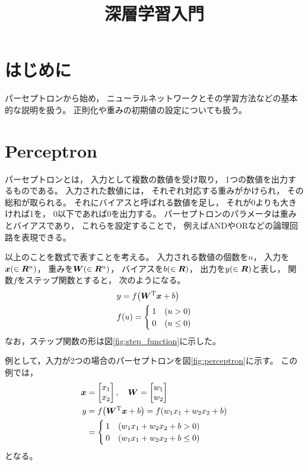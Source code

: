 \documentclass[class=jsarticle, crop=false, dvipdfmx, fleqn]{standalone}
\title{深層学習入門}
\begin{document}
\maketitle
\tableofcontents


\section{はじめに}

パーセプトロンから始め，
ニューラルネットワークとその学習方法などの基本的な説明を扱う。
正則化や重みの初期値の設定についても扱う。



\section{Perceptron}
\label{sec:perceptron}

パーセプトロンとは，
入力として複数の数値を受け取り，
1つの数値を出力するものである。
入力された数値には，
それぞれ対応する重みがかけられ，
その総和が取られる。
それにバイアスと呼ばれる数値を足し，
それが0よりも大きければ1を，
0以下であれば0を出力する。
パーセプトロンのパラメータは重みとバイアスであり，
これらを設定することで，
例えばANDやORなどの論理回路を表現できる。

以上のことを数式で表すことを考える。
入力される数値の個数を$n$，
入力を$\bm{x} \qty(\in \bm{R}^n)$，
重みを$\bm{W} \qty(\in \bm{R}^n)$，
バイアスを$b\qty(\in \bm{R})$，
出力を$y\qty(\in \bm{R})$と表し，
関数$f$をステップ関数とすると，
次のようになる。
\begin{align}
& y = f \qty(\bm{W}^\mathrm{T} \bm{x} + b) \\
& f(u) =
	\begin{cases}
		1 & (u > 0) \\
		0 & (u \leq 0)
	\end{cases}
\end{align}
なお，ステップ関数の形は図\ref{fig:step_function}に示した。

例として，入力が2つの場合のパーセプトロンを図\ref{fig:perceptron}に示す。
この例では，
\begin{align}
\bm{x} & = \begin{bmatrix} x_1 \\ x_2 \end{bmatrix}, \quad
\bm{W} = \begin{bmatrix} w_1 \\ w_2 \end{bmatrix} \\
y & = f\qty(\bm{W}^\mathrm{T} \bm{x} + b) = f\qty(w_1 x_1 + w_2 x_2 + b) \\
	 & =
	 	\begin{cases}
			1 & \qty(w_1 x_1 + w_2 x_2 + b > 0) \\
			0 & \qty(w_1 x_1 + w_2 x_2 + b \leq 0) 
		\end{cases}
\end{align}
となる。
\end{document}
